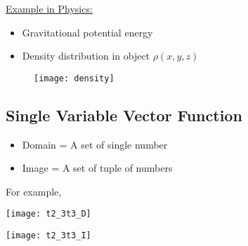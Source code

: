 \documentclass[class=article, crop=false, 12pt]{standalone}
\begin{document}
\ul{Example in Physics:}
\begin{itemize}
    \item Gravitational potential energy
\end{itemize}

\begin{minipage}[t]{0.5\textwidth}
    \begin{itemize}
        \item Density distribution in object $\rho(x,y,z)$
    \end{itemize}
\end{minipage}
\begin{minipage}[t]{0.48\textwidth}
    \begin{figure}[t]
        \strut\vspace*{-\baselineskip}\newline
        \texttt{[image: density]}
    \end{figure}
    
\end{minipage}

\subsection{Single Variable Vector Function}

\begin{itemize}
    \item Domain = A set of single number
    \item Image = A set of tuple of numbers
\end{itemize}

For example,

\begin{center}
    \begin{minipage}{0.15\textwidth}
    \end{minipage}
    \begin{minipage}{0.15\textwidth}
        \texttt{[image: t2\_3t3\_D]}
    \end{minipage}
    \green{$\xrightarrow{\hspace{0.15\textwidth}}$}
    \begin{minipage}{0.3\textwidth}
        \centering
        \texttt{[image: t2\_3t3\_I]}
    \end{minipage}
    \begin{minipage}{0.15\textwidth}
    \end{minipage}
\end{center}
\end{document}
